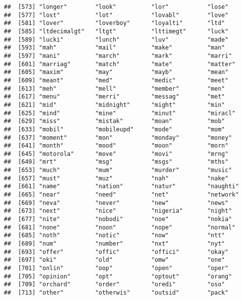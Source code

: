 \documentclass[]{article}
\begin{document}
\begin{verbatim}
##  [573] "longer"        "look"          "lor"           "lose"         
##  [577] "lost"          "lot"           "lovabl"        "love"         
##  [581] "lover"         "loverboy"      "loyalti"       "ltd"          
##  [585] "ltdecimalgt"   "ltgt"          "lttimegt"      "luck"         
##  [589] "lucki"         "lunch"         "luv"           "made"         
##  [593] "mah"           "mail"          "make"          "man"          
##  [597] "mani"          "march"         "mark"          "marri"        
##  [601] "marriag"       "match"         "mate"          "matter"       
##  [605] "maxim"         "may"           "mayb"          "mean"         
##  [609] "meant"         "med"           "medic"         "meet"         
##  [613] "meh"           "mell"          "member"        "men"          
##  [617] "menu"          "merri"         "messag"        "met"          
##  [621] "mid"           "midnight"      "might"         "min"          
##  [625] "mind"          "mine"          "minut"         "miracl"       
##  [629] "miss"          "mistak"        "moan"          "mob"          
##  [633] "mobil"         "mobileupd"     "mode"          "mom"          
##  [637] "moment"        "mon"           "monday"        "money"        
##  [641] "month"         "mood"          "moon"          "morn"         
##  [645] "motorola"      "move"          "movi"          "mrng"         
##  [649] "mrt"           "msg"           "msgs"          "mths"         
##  [653] "much"          "mum"           "murder"        "music"        
##  [657] "must"          "muz"           "nah"           "nake"         
##  [661] "name"          "nation"        "natur"         "naughti"      
##  [665] "near"          "need"          "net"           "network"      
##  [669] "neva"          "never"         "new"           "news"         
##  [673] "next"          "nice"          "nigeria"       "night"        
##  [677] "nite"          "nobodi"        "noe"           "nokia"        
##  [681] "none"          "noon"          "nope"          "normal"       
##  [685] "noth"          "notic"         "now"           "ntt"          
##  [689] "num"           "number"        "nxt"           "nyt"          
##  [693] "offer"         "offic"         "offici"        "okay"         
##  [697] "oki"           "old"           "omw"           "one"          
##  [701] "onlin"         "oop"           "open"          "oper"         
##  [705] "opinion"       "opt"           "optout"        "orang"        
##  [709] "orchard"       "order"         "oredi"         "oso"          
##  [713] "other"         "otherwis"      "outsid"        "pack"         

\end{verbatim}
\end{document}
